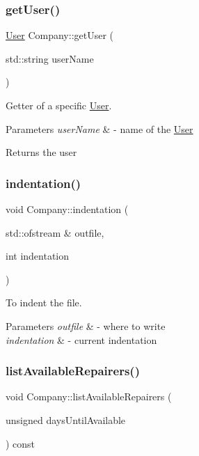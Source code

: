 \subsubsection{\texorpdfstring{get\+User()}{getUser()}}
{\footnotesize\ttfamily \mbox{\hyperlink{class_user}{User}} Company\+::get\+User (\begin{DoxyParamCaption}\item[{std\+::string}]{user\+Name }\end{DoxyParamCaption})}



Getter of a specific \mbox{\hyperlink{class_user}{User}}. 


\begin{DoxyParams}{Parameters}
{\em user\+Name} & -\/ name of the \mbox{\hyperlink{class_user}{User}} \\
\hline
\end{DoxyParams}
\begin{DoxyReturn}{Returns}
the user 
\end{DoxyReturn}
\mbox{\label{class_company_aa8b5bbb3b2d49d13f36d4fcdfc0d20d1}} 
\subsubsection{\texorpdfstring{indentation()}{indentation()}}
{\footnotesize\ttfamily void Company\+::indentation (\begin{DoxyParamCaption}\item[{std\+::ofstream \&}]{outfile,  }\item[{int}]{indentation }\end{DoxyParamCaption})}



To indent the file. 


\begin{DoxyParams}{Parameters}
{\em outfile} & -\/ where to write \\
\hline
{\em indentation} & -\/ current indentation \\
\hline
\end{DoxyParams}
\mbox{\label{class_company_a12366416c26ae1d5046695261374f440}} 
\subsubsection{\texorpdfstring{list\+Available\+Repairers()}{listAvailableRepairers()}}
{\footnotesize\ttfamily void Company\+::list\+Available\+Repairers (\begin{DoxyParamCaption}\item[{unsigned}]{days\+Until\+Available }\end{DoxyParamCaption}) const}



